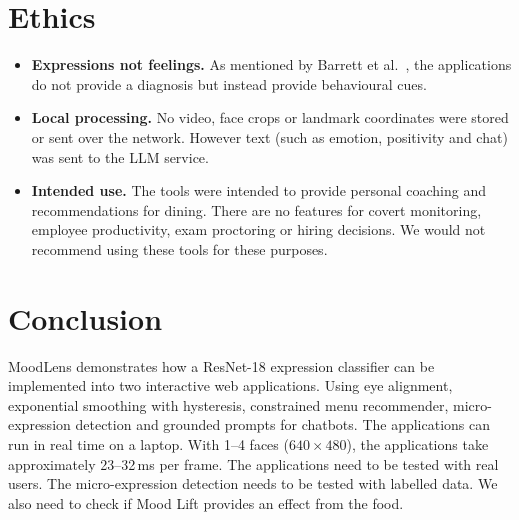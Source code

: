 \documentclass[conference]{IEEEtran}
\begin{document}
\section{Ethics}
\begin{itemize}
    \item \textbf{Expressions not feelings.} As mentioned by Barrett et al.~\cite{barrett}, the applications do not provide a diagnosis but instead provide behavioural cues.
    \item \textbf{Local processing.} No video, face crops or landmark coordinates were stored or sent over the network. However text (such as emotion, positivity and chat) was sent to the LLM service.
    \item \textbf{Intended use.} The tools were intended to provide personal coaching and recommendations for dining. There are no features for covert monitoring, employee productivity, exam proctoring or hiring decisions. We would not recommend using these tools for these purposes.
\end{itemize}

\section{Conclusion}
MoodLens demonstrates how a ResNet-18 expression classifier can be implemented into two interactive web applications. Using eye alignment, exponential smoothing with hysteresis, constrained menu recommender, micro-expression detection and grounded prompts for chatbots. The applications can run in real time on a laptop. With 1--4 faces ($640\times480$), the applications take approximately 23--32\,ms per frame. The applications need to be tested with real users. The micro-expression detection needs to be tested with labelled data. We also need to check if Mood Lift provides an effect from the food.

\end{document}
